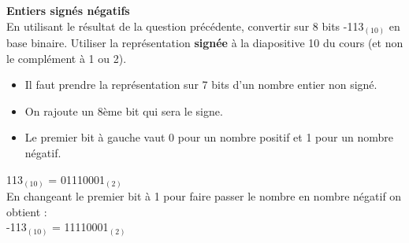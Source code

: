\begin{Exercice}[5 minutes] \textbf{Entiers signés négatifs}\\
    En utilisant le résultat de la question précédente, convertir sur 8 bits -113$_{(10)}$ en base binaire. Utiliser la représentation \textbf{signée} à la diapositive 10 du cours (et non le complément à 1 ou 2). \\

    \begin{conseil}
        \begin{itemize}
        	\item Il faut prendre la représentation sur 7 bits d'un nombre entier non signé.
        	\item On rajoute un 8ème bit qui sera le signe.
        	\item Le premier bit à gauche vaut 0 pour un nombre positif et 1 pour un nombre négatif.
        \end{itemize} 
    \end{conseil}
    
    \begin{solution}
         113$_{(10)}$ = 01110001$_{(2)}$ \\
         
         En changeant le premier bit à 1 pour faire passer le nombre en nombre négatif on obtient : \\
         
         -113$_{(10)}$ = 11110001$_{(2)}$ \\
    \end{solution}
\end{Exercice}

